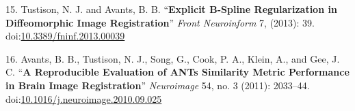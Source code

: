 \documentclass[12pt,]{article}
\begin{document}
\hypertarget{ref-Tustison:2013ac}{}
15. Tustison, N. J. and Avants, B. B. ``\textbf{Explicit B-Spline
Regularization in Diffeomorphic Image Registration}'' \emph{Front
Neuroinform} 7, (2013): 39.
doi:\href{https://doi.org/10.3389/fninf.2013.00039}{10.3389/fninf.2013.00039}

\hypertarget{ref-Avants:2011ab}{}
16. Avants, B. B., Tustison, N. J., Song, G., Cook, P. A., Klein, A.,
and Gee, J. C. ``\textbf{A Reproducible Evaluation of ANTs Similarity
Metric Performance in Brain Image Registration}'' \emph{Neuroimage} 54,
no. 3 (2011): 2033--44.
doi:\href{https://doi.org/10.1016/j.neuroimage.2010.09.025}{10.1016/j.neuroimage.2010.09.025}
\end{document}
